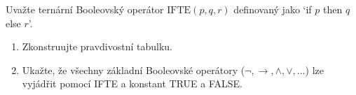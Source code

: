 \documentclass[a4paper,12pt]{article}
\begin{document}
    
    \medskip\begin{problem}
    Uvažte ternární Booleovský operátor $\mathrm{IFTE}(p, q, r)$ definovaný jako `if $p$ then $q$ else $r$'. 
    \begin{enumerate}
        \item Zkonstruujte pravdivostní tabulku.
        \item Ukažte, že všechny základní Booleovské operátory ($\neg, \to, \wedge,\vee,\dots$) lze vyjádřit pomocí IFTE a konstant TRUE a FALSE.
    \end{enumerate}  
    \end{problem}

   
\end{document}
